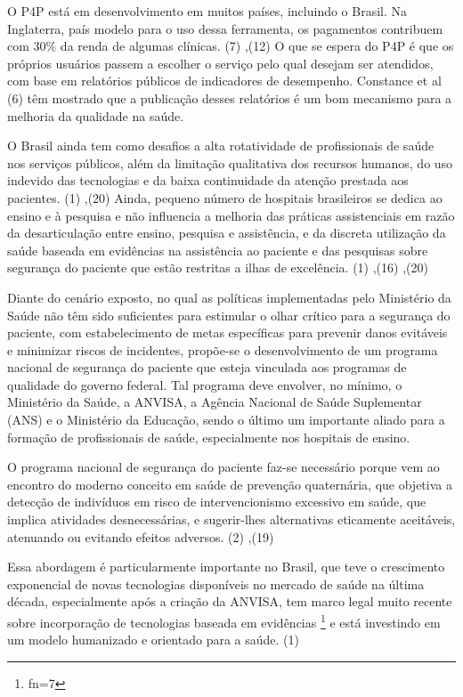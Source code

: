 \documentclass{article}
\makeatletter
\newcommand{\fn}{\afterassignment\fn@aux\count0=}
\newcommand{\fn@aux}{\csname fn\the\count0\endcsname}
\makeatother
\begin{document}
O P4P está em desenvolvimento em muitos países, incluindo o Brasil. Na
Inglaterra, país
modelo para o uso dessa ferramenta, os pagamentos contribuem com 30\% da renda
de algumas
clínicas. (7)
,(12)
O que se espera do P4P é que os próprios usuários passem a escolher o serviço
pelo
qual desejam ser atendidos, com base em relatórios públicos de indicadores de
desempenho.
Constance et al (6)
têm mostrado que a publicação desses relatórios é um bom mecanismo para a
melhoria
da qualidade na saúde.

O Brasil ainda tem como desafios a alta rotatividade de profissionais de saúde
nos serviços
públicos, além da limitação qualitativa dos recursos humanos, do uso indevido
das
tecnologias e da baixa continuidade da atenção prestada aos pacientes. (1)
,(20)
Ainda, pequeno número de hospitais brasileiros se dedica ao ensino e à pesquisa
e
não influencia a melhoria das práticas assistenciais em razão da desarticulação
entre
ensino, pesquisa e assistência, e da discreta utilização da saúde baseada em
evidências na
assistência ao paciente e das pesquisas sobre segurança do paciente que estão
restritas a
ilhas de excelência. (1)
,(16)
,(20)

Diante do cenário exposto, no qual as políticas implementadas pelo Ministério da
Saúde não
têm sido suficientes para estimular o olhar crítico para a segurança do
paciente, com
estabelecimento de metas específicas para prevenir danos evitáveis e minimizar
riscos de
incidentes, propõe-se o desenvolvimento de um programa nacional de segurança do
paciente que
esteja vinculada aos programas de qualidade do governo federal. Tal programa
deve envolver,
no mínimo, o Ministério da Saúde, a ANVISA, a Agência Nacional de Saúde
Suplementar (ANS) e
o Ministério da Educação, sendo o último um importante aliado para a formação de
profissionais de saúde, especialmente nos hospitais de ensino.

O programa nacional de segurança do paciente faz-se necessário porque vem ao
encontro do
moderno conceito em saúde de prevenção quaternária, que objetiva a detecção de
indivíduos em
risco de intervencionismo excessivo em saúde, que implica atividades
desnecessárias, e
sugerir-lhes alternativas eticamente aceitáveis, atenuando ou evitando efeitos
adversos.
(2)
,(19)

Essa abordagem é particularmente importante no Brasil, que teve o crescimento
exponencial
de novas tecnologias disponíveis no mercado de saúde na última década,
especialmente após a
criação da ANVISA, tem marco legal muito recente sobre incorporação de
tecnologias baseada
em evidências \footnote{\fn7}
e está investindo em um modelo humanizado e orientado para a saúde. (1)
\end{document}
